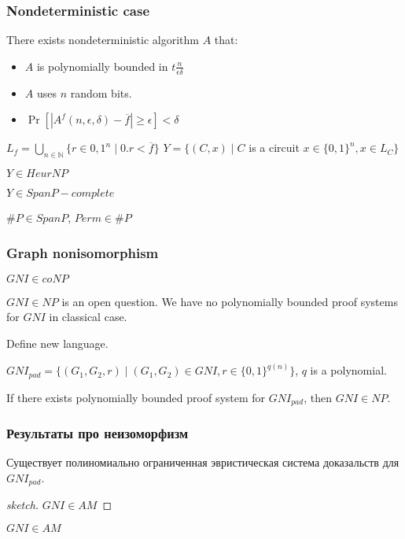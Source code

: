 \begin{frame}
    \frametitle{Nondeterministic case}

    \begin{proposition}%
        There exists nondeterministic algorithm $A$ that:
        \begin{itemize}
	        \item $A$ is polynomially bounded in $t\frac{n}{\epsilon\delta}$
        	\item $A$ uses $n$ random bits.
        	\item $\Pr[|A^{f}(n, \epsilon, \delta) - \overline{f}| \ge \epsilon] <
		        \delta$
        \end{itemize}
    \end{proposition}

    $L_f = \bigcup\limits_{n \in \mathbb{N}}\{r \in {0, 1}^n \mid 0.r < \overline{f}\}$
	$Y = \{(C, x) \mid C$ is a circuit $x \in \{0, 1\}^n, x \in L_{C}\}$
    
    \begin{lemma}
        $Y \in HeurNP$
    \end{lemma}

    \begin{proposition}
        $Y \in SpanP-complete$
    \end{proposition}
    
    $\#P \in SpanP$, $Perm \in \#P$
\end{frame}

\begin{frame}
    \frametitle{Graph nonisomorphism}

    $GNI \in coNP$
    
    $GNI \in NP$ is an open question. We have no polynomially bounded proof systems
    for $GNI$ in classical case.

    Define new language.

    \begin{definition}
        $GNI_{pad} = \{(G_1, G_2, r) \mid (G_1, G_2) \in GNI,
        r \in \{0, 1\}^{q(n)}\}$, $q$ is a polynomial.
    \end{definition}

    \begin{lemma}
        If there exists polynomially bounded proof system for
        $GNI_{pad}$, then $GNI \in NP$.
    \end{lemma}
\end{frame}

\begin{frame}
    \frametitle{Результаты про неизоморфизм}

    \begin{theorem}
        Существует полиномиально ограниченная эвристическая система доказальств для
        $GNI_{pad}$.
    \end{theorem}

    \begin{proof}[sketch]
        $GNI \in AM$
    \end{proof}
    $GNI \in AM$
\end{frame}